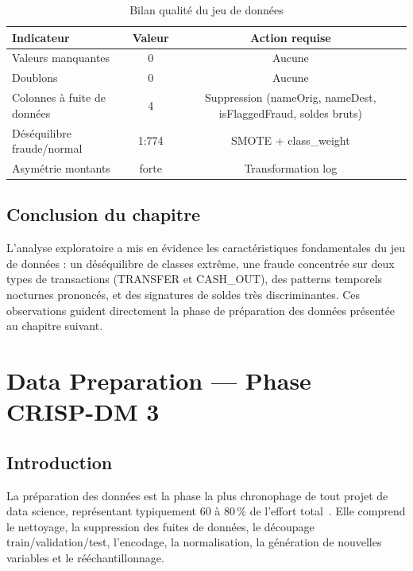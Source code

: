 \documentclass[12pt,a4paper,twoside]{report}
\theoremstyle{definition}
\begin{document}
\begin{table}[H]
\centering
\caption{Bilan qualité du jeu de données}
\label{tab:data_quality}
\renewcommand{\arraystretch}{1.3}
\begin{tabular}{lcc}
\toprule
\textbf{Indicateur} & \textbf{Valeur} & \textbf{Action requise} \\
\midrule
Valeurs manquantes & 0 & Aucune \\
Doublons & 0 & Aucune \\
Colonnes à fuite de données & 4 & Suppression (nameOrig, nameDest, isFlaggedFraud, soldes bruts) \\
Déséquilibre fraude/normal & 1:774 & SMOTE + class\_weight \\
Asymétrie montants & forte & Transformation log \\
\bottomrule
\end{tabular}
\end{table}

\section{Conclusion du chapitre}

L'analyse exploratoire a mis en évidence les caractéristiques fondamentales du
jeu de données : un déséquilibre de classes extrême, une fraude concentrée sur
deux types de transactions (TRANSFER et CASH\_OUT), des patterns temporels nocturnes
prononcés, et des signatures de soldes très discriminantes. Ces observations guident
directement la phase de préparation des données présentée au chapitre suivant.

\chapter{Data Preparation — Phase CRISP-DM 3}
\label{chap:dataprep}

\section{Introduction}

La préparation des données est la phase la plus chronophage de tout projet de
data science, représentant typiquement 60 à 80\,\% de l'effort total~\cite{press2016cleaning}.
Elle comprend le nettoyage, la suppression des fuites de données, le découpage
train/validation/test, l'encodage, la normalisation, la génération de nouvelles
variables et le rééchantillonnage.
\end{document}
